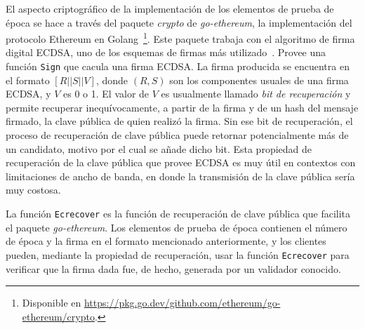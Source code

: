 El aspecto criptográfico de la implementación de los elementos de prueba de época se
hace a través del paquete \textit{crypto} de \textit{go-ethereum}, la implementación
del protocolo Ethereum en Golang~\footnote{Disponible en \url{https://pkg.go.dev/github.com/ethereum/go-ethereum/crypto}.}.
%
Este paquete trabaja con el algoritmo de firma digital ECDSA, uno de los esquemas de firmas más
utilizado~\cite{real.world.crypto}.
%
Provee una función \texttt{Sign} que cacula una firma ECDSA.
%
La firma producida se encuentra en el formato $[R || S || V]$, donde $(R, S)$ son los componentes usuales
de una firma ECDSA, y $V$ es 0 o 1.
%
El valor de $V$ es usualmente llamado \textit{bit de recuperación} y permite recuperar inequívocamente,
a partir de la firma y de un hash del mensaje firmado, la clave pública de quien realizó la firma.
%
Sin ese bit de recuperación, el proceso de recuperación de clave pública puede retornar potencialmente
más de un candidato, motivo por el cual se añade dicho bit.
% 
Esta propiedad de recuperación de la clave pública que provee ECDSA es muy útil en contextos con limitaciones
de ancho de banda, en donde la transmisión de la clave pública sería muy costosa.


La función \texttt{Ecrecover} es la función de recuperación de clave pública que facilita el paquete \textit{go-ethereum}.
%
Los elementos de prueba de época contienen el número de
época y la firma en el formato mencionado anteriormente, y los clientes pueden, mediante la propiedad de recuperación,
usar la función \texttt{Ecrecover} para
verificar que la firma dada fue, de hecho, generada por un validador conocido.
%

